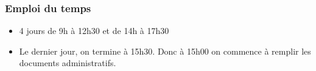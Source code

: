 
\begin{frame}
  \frametitle{Emploi du temps}
  \begin{itemize}
  \item 4 jours de 9h à 12h30 et de 14h à 17h30
  \item Le dernier jour, on termine à 15h30. Donc à 15h00 on commence à remplir les documents administratifs.
  \end{itemize}
\end{frame}
